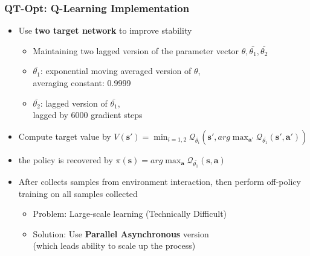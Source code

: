 \documentclass{beamer}
\renewcommand{\vec}[1]{\mathbf{#1}}
\newcommand{\forthSec}{QT-Opt}
\begin{document}
    \begin{frame}
      \frametitle{\forthSec: Q-Learning Implementation}
      \begin{itemize}
        \item Use \textbf{two target network} to improve stability
        \begin{itemize}
          \item Maintaining two lagged version of the parameter vector $\theta, \bar{\theta_1}, \bar{\theta_2}$
          \item $\bar{\theta_1}$: exponential moving averaged version of $\theta$, \\ 
                averaging constant: 0.9999
          \item $\bar{\theta_2}$: lagged version of $\bar{\theta_1}$, \\
                lagged by 6000 gradient steps
        \end{itemize}
        \pause
        \item Compute target value by $V(\vec{s'}) = \min_{i = 1, 2}\mathcal{Q}_{\bar{\theta_i}}(\vec{s'}, arg\max_{\vec{a'}}\mathcal{Q}_{\bar{\theta_1}}(\vec{s'}, \vec{a'}))$
        \pause
        \item the policy is recovered by $\pi(\vec{s}) = arg\max_{\vec{a}}\mathcal{Q}_{\bar{\theta_1}}(\vec{s}, \vec{a})$
        \pause
        \item After collects samples from environment interaction, then perform off-policy training on all samples collected
        \begin{itemize}
          \item Problem: Large-scale learning (Technically Difficult)
          \item Solution: Use \textbf{Parallel Asynchronous} version \\
                (which leads ability to scale up the process)
        \end{itemize}
      \end{itemize}
    \end{frame}
\end{document}
